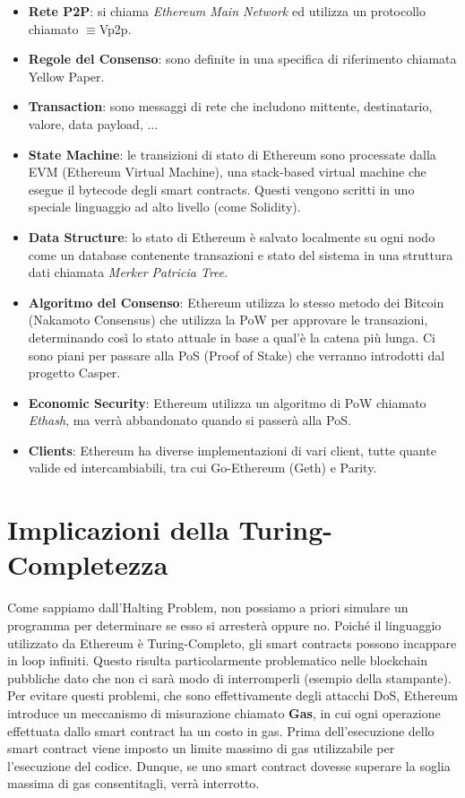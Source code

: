 \begin{itemize}
      \item \textbf{Rete P2P}: si chiama \textit{Ethereum Main Network} ed
            utilizza un protocollo chiamato \DH$\equiv$Vp2p.
      \item \textbf{Regole del Consenso}: sono definite in una specifica di riferimento chiamata
            Yellow Paper.
      \item \textbf{Transaction}: sono messaggi di rete che includono mittente, destinatario,
            valore, data payload, ...
      \item \textbf{State Machine}: le transizioni di stato di Ethereum sono processate dalla
            EVM (Ethereum Virtual Machine), una stack-based virtual machine che esegue il bytecode
            degli smart contracts. Questi vengono scritti in uno speciale linguaggio ad alto livello
            (come Solidity).
      \item \textbf{Data Structure}: lo stato di Ethereum è salvato localmente su ogni nodo come
            un database contenente transazioni e stato del sistema in una struttura dati chiamata
            \textit{Merker Patricia Tree}.
      \item \textbf{Algoritmo del Consenso}: Ethereum utilizza lo stesso metodo dei Bitcoin
            (Nakamoto Consensus) che utilizza la PoW per approvare le transazioni,
            determinando così lo stato attuale in base a qual'è la catena più lunga.
            Ci sono piani per passare alla PoS (Proof of Stake) che verranno introdotti dal
            progetto Casper.
      \item \textbf{Economic Security}: Ethereum utilizza un algoritmo di PoW chiamato \textit{Ethash},
            ma verrà abbandonato quando si passerà alla PoS.
      \item \textbf{Clients}: Ethereum ha diverse implementazioni di vari client,
            tutte quante valide ed intercambiabili, tra cui Go-Ethereum (Geth) e Parity.
\end{itemize}

\section{Implicazioni della Turing-Completezza}
Come sappiamo dall'Halting Problem, non possiamo a priori simulare un programma per
determinare se esso si arresterà oppure no. Poiché il linguaggio utilizzato da Ethereum è
Turing-Completo, gli smart contracts possono incappare in loop infiniti. Questo risulta
particolarmente problematico nelle blockchain pubbliche dato che non ci sarà modo di interromperli
(esempio della stampante). Per evitare questi problemi, che sono effettivamente degli attacchi DoS,
Ethereum introduce un meccanismo di misurazione chiamato \textbf{Gas}, in cui ogni operazione
effettuata dallo smart contract ha un costo in gas. Prima dell'esecuzione dello smart contract
viene imposto un limite massimo di gas utilizzabile per l'esecuzione del codice.
Dunque, se uno smart contract dovesse superare la soglia massima di gas consentitagli,
verrà interrotto.\\

